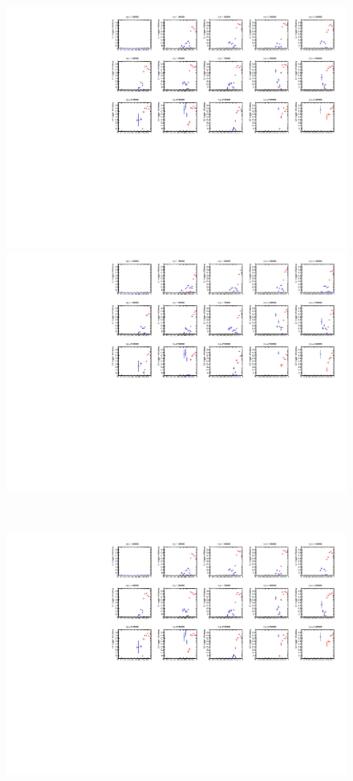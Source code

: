 \begin{figure}[tbp]
\begin{minipage}{0.49\hsize}
    \includegraphics[width=\textwidth,page=15]{img/rec/stau_600_ori.pdf}
    \subcaption{}
    \end{minipage}
    \begin{minipage}{0.49\hsize}
    \centering   
    \includegraphics[width=\textwidth,page=15]{img/rec/stau_600.pdf}
    \subcaption{}
    \end{minipage}\\
    \begin{minipage}{0.49\hsize}
    \centering   
    \includegraphics[width=\textwidth,page=14]{img/rec/stau_600_ori.pdf}

\end{minipage}
\end{figure}
